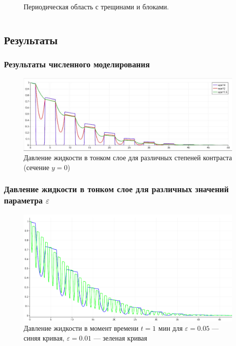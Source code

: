 \documentclass[unicode,aspectratio=43]{beamer}
\def \ve{\varepsilon} %
\begin{document}
\begin{frame}
\begin{columns}
\begin{column}{.4\textwidth}
\begin{figure}[ht!]

\caption{Периодическая область с трещинами и блоками.}

\end{figure}
\end{column}
\end{columns}

\end{frame}

\subsection{Результаты}

\begin{frame}\frametitle{Результаты численного моделирования}

\begin{figure}[ht!]
\centering
\includegraphics[scale=0.33]{voloshin2.jpg}
\caption{Давление жидкости в тонком слое для различных степеней контраста (сечение $y = 0$)}
\label{Figure 3}	
\end{figure}


\end{frame}

\begin{frame}\frametitle{Давление жидкости в тонком слое для различных значений параметра $\ve$}
\begin{figure}
\includegraphics[scale=0.25]{voloshin3+.png}
\caption{Давление жидкости в момент времени $t = 1\, \ \text{мин}$ для $\ve = 0.05$ --- синяя кривая, $\ve = 0.01$ --- зеленая кривая}
\label{Figure 4}	
\end{figure}

\end{frame}
\end{document}
